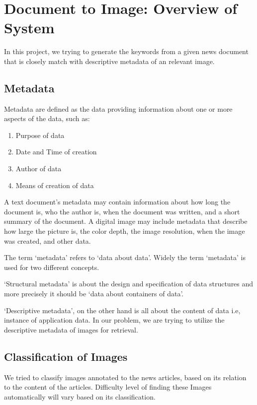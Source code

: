 \chapter{Document to Image: Overview of System}
In this project, we trying to generate the keywords from a given news document that is closely match with descriptive metadata of an relevant image.


\section{Metadata}
Metadata are defined as the data providing information about one or more aspects of the data, such as:
\begin{enumerate}
\item{Purpose of data}
\item{Date and Time of creation}
\item{Author of data}
\item{Means of creation of data}
\end{enumerate}

A text document's metadata may contain information about how long the document is, who the author is, when the document was written, and a short summary of the document. A digital image may include metadata that describe how large the picture is, the color depth, the image resolution, when the image was created, and other data.

The term `metadata' refers to `data about data'. Widely the term `metadata' is used for two different concepts. 

`Structural metadata' is about the design and specification of data structures and more precisely it should be `data about containers of data'.

`Descriptive metadata', on the other hand is all about the content of data i.e, instance of application data. In our problem, we are trying to utilize the descriptive metadata of images for retrieval. 

\section{Classification of Images}

We tried to classify images annotated to the news articles, based on its relation to the content of the articles. Difficulty level of finding these Images automatically will vary based on its classification.

